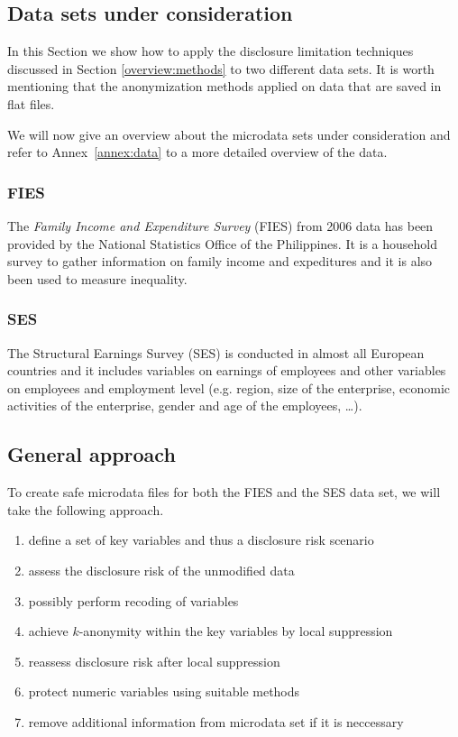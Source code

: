 \documentclass[12pt]{article}
\begin{document}
\subsection{Data sets under consideration} \label{data:descr}
In this Section we show how to apply the disclosure limitation techniques 
discussed in Section \ref{overview:methods} to two different data sets. 
It is worth mentioning that the anonymization methods applied on data that are saved in flat files.

We will now give an overview about the microdata sets under consideration and refer to Annex~\ref{annex:data} to 
a more detailed overview of the data.


\subsubsection{FIES}
The \textit{Family Income and Expenditure Survey} (FIES) from 2006 data has been 
provided by the National Statistics Office of the Philippines. 
It is a household survey to gather information on family income and expeditures and it is also been used to
measure inequality.

\subsubsection{SES}
The Structural Earnings Survey (SES) is conducted in almost all European
countries and it includes variables on earnings of employees and other variables on 
employees and employment level (e.g. region, size of the enterprise, economic activities of the enterprise, 
gender and age of the employees, \ldots).



\subsection{General approach}

To create safe microdata files for both the FIES and the SES data set, we will take the following approach. 
\begin{enumerate}
\item define a set of key variables and thus a disclosure risk scenario
	\item assess the disclosure risk of the unmodified data
	\item possibly perform recoding of variables 
	\item achieve $k$-anonymity within the key variables by local suppression
	\item reassess disclosure risk after local suppression
	\item protect numeric variables using suitable methods
	\item remove additional information from microdata set if it is neccessary
\end{enumerate}
\end{document}
